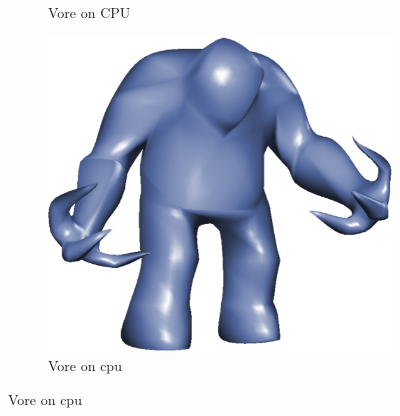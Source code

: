 \begin{figure}
\begin{subfigure}[b]{0.2\textwidth}
		\caption{Vore on CPU}
		\label{fig:results:cpugpu:cpuVore}
	\end{subfigure}	
	\hspace{0.1\textwidth}
	\begin{subfigure}[b]{0.2\textwidth}
		\centering
		\includegraphics[width=\textwidth]{content/img/results/shamblercpu.png}
		\caption{Vore on cpu}
		\label{fig:results:cpugpu:cpuShambler}
	\end{subfigure}		


\end{figure}
